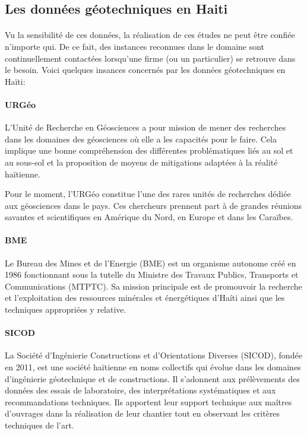        \subsection{Les données géotechniques en Haiti}
       \paragraph{}
        Vu la sensibilité de ces données, la réalisation de ces études ne peut être confiée n'importe qui. De ce 
        fait, des instances reconnues dans le domaine sont continuellement contactées 
        lorsqu'une firme (ou un particulier) se retrouve dans le besoin. Voici quelques insances concernés par les données géotechniques en Haïti:
        \paragraph{URGéo}
        L'Unité de Recherche en Géosciences a pour mission de mener des recherches dans les
        domaines des géosciences où elle a les capacités pour le faire.
        Cela implique une bonne compréhension des différentes problématiques liés au sol et
        au sous-sol et la proposition de moyens de mitigations adaptées à la réalité haïtienne.
        \cite{mission_urgeo}
        \par
        Pour le moment, l’URGéo constitue l’une des rares unités de recherches dédiée aux
        géosciences dans le pays. 
        Ces chercheurs prennent part à de grandes réunions savantes et scientifiques en
        Amérique du Nord, en Europe et dans les Caraïbes.
        \cite{urgeo_nouvelliste}
        \paragraph{BME}
        Le Bureau des Mines et de l’Energie (BME) est un organisme autonome créé en 
        1986 fonctionnant sous la tutelle du Ministre des Travaux Publics, Transports 
        et Communications (MTPTC). Sa mission principale est de promouvoir la recherche
        et l'exploitation des ressources minérales et énergétiques d'Haíti ainsi que les 
        techniques appropriées y relative.
        \paragraph{SICOD}
        La  Société d’Ingénierie Constructions et d’Orientations Diverses (SICOD),
         fondée en 2011, est une société haïtienne en noms collectifs qui évolue dans les domaines d’ingénierie géotechnique et de constructions.
         Il s'adonnent aux prélèvements des données des essais de laboratoire, des interprétations systématiques et aux recommandations techniques. 
         Ils apportent leur support technique aux maîtres d'ouvrages dans la réalisation de leur chantier tout en observant les critères techniques de l'art.
